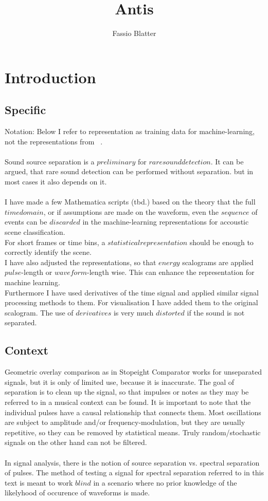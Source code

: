 \documentclass{report}
\begin{document}
\title{Antis}
\author{Fassio Blatter}
\maketitle

\chapter{Introduction}
\section{Specific}
Notation: Below I refer to representation as training data for machine-learning, not the representations from ~\cite[Spline\_Axioms.tex]{Axioms}.\\\\
Sound source separation is a $preliminary$ for $rare sound detection$. It can be argued, that rare sound detection can be performed without separation. but in most cases it also depends on it.\\\\
I have made a few Mathematica scripts (tbd.) based on the theory that the full $time domain$, or if assumptions are made on the waveform, even the $sequence$ of events can be $discarded$ in the machine-learning representations for accoustic scene classification.\\
For short frames or time bins, a $statistical representation$ should be enough to correctly identify the scene.\\
I have also adjusted the representations, so that $energy$ scalograms are applied $pulse$-length or $waveform$-length wise. This can enhance the representation for machine learning.\\
Furthermore I have used derivatives of the time signal and applied similar signal processing methods to them. For visualisation I have added them to the original scalogram. The use of $derivatives$ is very much $distorted$ if the sound is not separated.
\section{Context}
Geometric overlay comparison as in Stopeight Comparator works for unseparated signals, but it is only of limited use, because it is inaccurate. The goal of separation is to clean up the signal, so that impulses or notes as they may be referred to in a musical context can be found. It is important to note that the individual pulses have a causal relationship that connects them. Most oscillations are subject to amplitude and/or frequency-modulation, but they are usually repetitive, so they can be removed by statistical means. Truly random/stochastic signals on the other hand can not be filtered.\\\\
In signal analysis, there is the notion of source separation vs. spectral separation of pulses. The method of testing a signal for spectral separation referred to in this text is meant to work $blind$ in a scenario where no prior knowledge of the likelyhood of occurence of waveforms is made.
\end{document}
